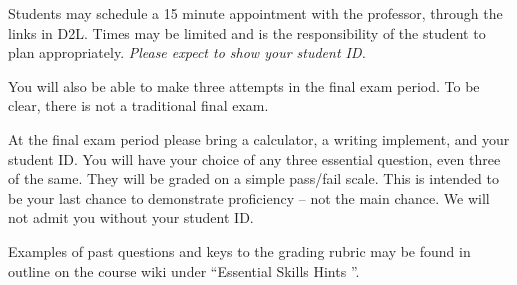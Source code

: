 \documentclass[letterpaper,10pt]{article}
\begin{document}
Students may schedule a 15 minute appointment with the professor, through the links
in D2L.   Times may be limited
and is the responsibility of the student to plan appropriately.
\emph{Please expect to show your student ID.}

You will also be able to make three attempts in the
final exam period.   To be clear, there is not a traditional final exam.


At the final exam period please bring a calculator, a writing implement, and
your student ID.  You will have your choice of any three essential
question, even three of the same.  They will be graded on a simple
pass/fail scale.  This is intended to be your last chance to
demonstrate proficiency -- not the main chance.  We will not admit you
without your student ID.

Examples of past questions and keys to the grading rubric may be found
in outline on the course wiki under ``Essential Skills Hints ''.



\end{document}
